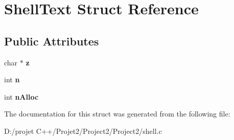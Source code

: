 \hypertarget{struct_shell_text}{}\section{Shell\+Text Struct Reference}
\label{struct_shell_text}
\subsection*{Public Attributes}
\begin{DoxyCompactItemize}
\item 
\mbox{\label{struct_shell_text_ad7acc0c56c1066a865700d2f472b7069}} 
char $\ast$ {\bfseries z}
\item 
\mbox{\label{struct_shell_text_a8b8addc0530be548b9f118dc90ef6d30}} 
int {\bfseries n}
\item 
\mbox{\label{struct_shell_text_a44c20e5561668de289aa47e7d65e8ead}} 
int {\bfseries n\+Alloc}
\end{DoxyCompactItemize}


The documentation for this struct was generated from the following file\+:\begin{DoxyCompactItemize}
\item 
D\+:/projet C++/\+Projet2/\+Project2/\+Project2/shell.\+c\end{DoxyCompactItemize}
